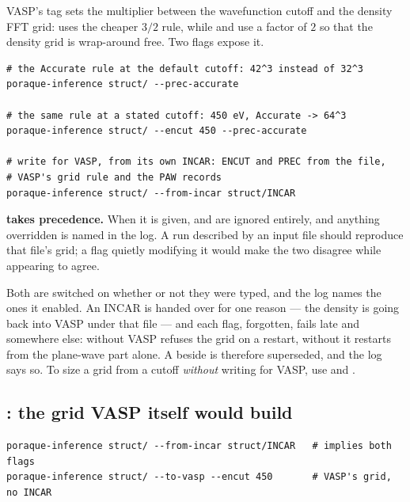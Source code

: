 VASP's  tag sets the multiplier between the wavefunction cutoff and
the density FFT grid:  uses the cheaper $3/2$ rule, while
 and  use a factor of $2$ so that the density grid is
wrap-around free. Two flags expose it.

\begin{lstlisting}
# the Accurate rule at the default cutoff: 42^3 instead of 32^3
poraque-inference struct/ --prec-accurate

# the same rule at a stated cutoff: 450 eV, Accurate -> 64^3
poraque-inference struct/ --encut 450 --prec-accurate

# write for VASP, from its own INCAR: ENCUT and PREC from the file,
# VASP's grid rule and the PAW records
poraque-inference struct/ --from-incar struct/INCAR
\end{lstlisting}

\begin{pwarn}
\textbf{ takes precedence.} When it is given, 
and  are ignored entirely, and anything overridden is
named in the log. A run described by an input file should reproduce that
file's grid; a flag quietly modifying it would make the two disagree while
appearing to agree.
\end{pwarn}

\begin{pwarn}[title={\opt{--from-incar} implies \opt{--to-vasp} and
\opt{--add-paw}}]
Both are switched on whether or not they were typed, and the log names the ones
it enabled. An INCAR is handed over for one reason --- the density is going
back into VASP under that file --- and each flag, forgotten, fails late and
somewhere else: without  VASP refuses the grid on a restart,
without  it restarts from the plane-wave part alone. A
 beside  is therefore superseded, and the
log says so. To size a grid from a cutoff \emph{without} writing for VASP, use
 and .
\end{pwarn}

\subsection{: the grid VASP itself would build}

\begin{lstlisting}
poraque-inference struct/ --from-incar struct/INCAR   # implies both flags
poraque-inference struct/ --to-vasp --encut 450       # VASP's grid, no INCAR
\end{lstlisting}

